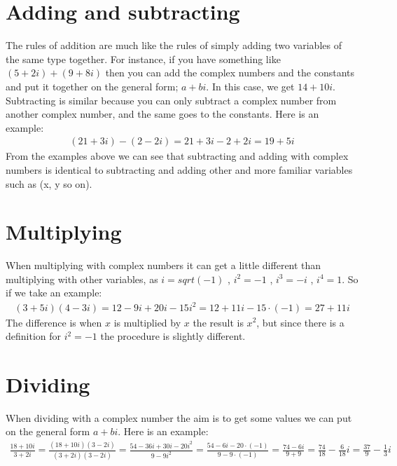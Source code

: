 \section{Adding and subtracting}
The rules of addition are much like the rules of simply adding two variables of the same type together. For instance, if you have something like $(5+2i)+(9+8i)$ then you can add the complex numbers and the constants and put it together on the general form; $a+bi$. In this case, we get $14+10i$. 
\\
Subtracting is similar because you can only subtract a complex number from another complex number, and the same goes to the constants. Here is an example: \\
\begin{align*}
(21 + 3i) - (2 - 2i) = 21 + 3i - 2 + 2i = 19 + 5i
\end{align*}
From the examples above we can see that subtracting and adding with complex numbers is identical to subtracting and adding other and more familiar variables such as (x, y so on).
\section{Multiplying}
When multiplying with complex numbers it can get a little different than multiplying with other variables, as $i=sqrt(-1)$ , $i^2=-1$ , $i^3=-i$ , $i^4=1$. So if we take an example: \\
\begin{align*}
(3+5i)(4-3i) = 12 - 9i + 20i - 15i^2 = 12 + 11i - 15 \cdot (-1) = 27 + 11i
\end{align*}
The difference is when $x$ is multiplied by $x$ the result is $x^2$, but since there is a definition for $i^2=-1$ the procedure is slightly different.
\section{Dividing}
When dividing with a complex number the aim is to get some values we can put on the general form $a + bi$. Here is an example: \\
\begin{align*}
\frac{18 + 10i}{3 + 2i} =\frac{(18 + 10i)(3 - 2i)}{(3+2i)(3-2i)} =\frac{54 - 36i + 30i - 20i^2}{9 - 9i^2} =\frac{54 - 6i - 20 \cdot (-1)}{9 - 9 \cdot (-1)} =\frac{74 - 6i}{9 + 9} =\frac{74}{18} - \frac{6}{18}i =\frac{37}{9} - \frac{1}{3}i
\end{align*}